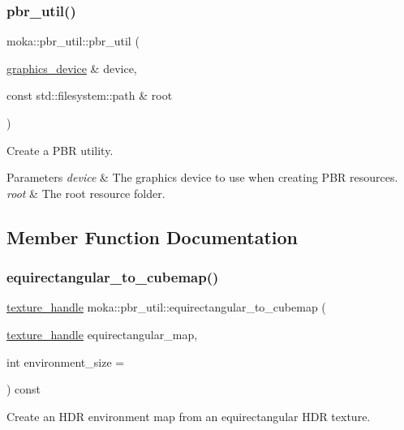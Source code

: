 \subsubsection{\texorpdfstring{pbr\_util()}{pbr\_util()}}
{\footnotesize\ttfamily moka\+::pbr\+\_\+util\+::pbr\+\_\+util (\begin{DoxyParamCaption}\item[{\mbox{\hyperlink{classmoka_1_1graphics__device}{graphics\+\_\+device}} \&}]{device,  }\item[{const std\+::filesystem\+::path \&}]{root }\end{DoxyParamCaption})}



Create a P\+BR utility. 


\begin{DoxyParams}{Parameters}
{\em device} & The graphics device to use when creating P\+BR resources. \\
\hline
{\em root} & The root resource folder. \\
\hline
\end{DoxyParams}


\subsection{Member Function Documentation}
\mbox{\label{classmoka_1_1pbr__util_ad0063494b8f2fc1e2b0a79b70facbdd0}} 
\subsubsection{\texorpdfstring{equirectangular\_to\_cubemap()}{equirectangular\_to\_cubemap()}}
{\footnotesize\ttfamily \mbox{\hyperlink{structmoka_1_1texture__handle}{texture\+\_\+handle}} moka\+::pbr\+\_\+util\+::equirectangular\+\_\+to\+\_\+cubemap (\begin{DoxyParamCaption}\item[{\mbox{\hyperlink{structmoka_1_1texture__handle}{texture\+\_\+handle}}}]{equirectangular\+\_\+map,  }\item[{int}]{environment\+\_\+size = {} }\end{DoxyParamCaption}) const}



Create an H\+DR environment map from an equirectangular H\+DR texture. 


